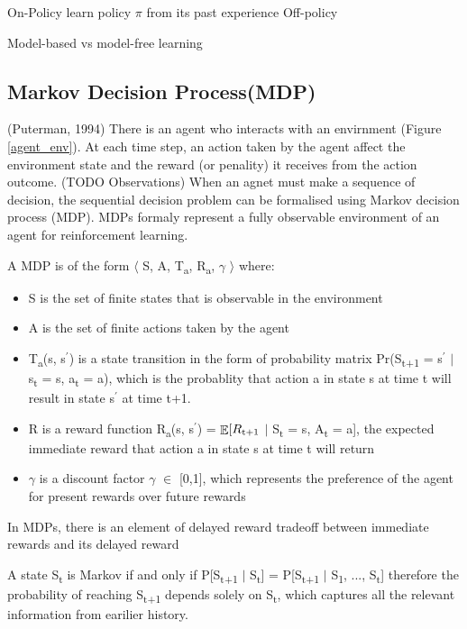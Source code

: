 \documentclass[12pt,twoside]{report}
\DeclareMathOperator{\E}{\mathbb{E}}
\begin{document}

On-Policy learn policy $\pi$ from its past experience
Off-policy

Model-based vs model-free learning

\subsection{Markov Decision Process(MDP)}


(Puterman, 1994)
There is an agent who interacts with an envirnment (Figure \ref{agent_env}). At each time step, an action taken by the agent affect the environment state and the reward (or penality) it receives from the action outcome. (TODO Observations)
When an agnet must make a sequence of decision, the sequential decision problem can be formalised using Markov decision process (MDP). MDPs formaly represent a fully observable environment of an agent for reinforcement learning.

A MDP is of the form $\langle$ S, A, T\textsubscript{a}, R\textsubscript{a}, $\gamma$ $\rangle$ where: \\

\begin{itemize}
\item S is the set of finite states that is observable in the environment
\item A is the set of finite actions taken by the agent
\item T\textsubscript{a}(s, s$^\prime$) is a state transition in the form of probability matrix Pr(S\textsubscript{t+1} = s$^\prime$ $\vert$ s\textsubscript{t} = s, a\textsubscript{t} = a), which is the probablity that action a in state s at time t will result in state s$^\prime$ at time t+1.
\item R is a reward function R\textsubscript{a}(s, s$^\prime$) = $\displaystyle \E[R\textsubscript{t+1} $ $\vert$ S\textsubscript{t} = s, A\textsubscript{t} = a], the expected immediate reward that action a in state s at time t will return
\item $\gamma$ is a discount factor $\gamma$ $\in$ [0,1], which represents the preference of the agent for present rewards over future rewards

\end{itemize}

In MDPs, there is an element of delayed reward tradeoff between immediate rewards and its delayed reward

A state S\textsubscript{t} is Markov if and only if
P[S\textsubscript{t+1} $\vert$ S\textsubscript{t}] = P[S\textsubscript{t+1} $\vert$ S\textsubscript{1}, ..., S\textsubscript{t}] therefore the probability of reaching S\textsubscript{t+1} depends solely on S\textsubscript{t}, which captures all the relevant information from earilier history.
\end{document}
